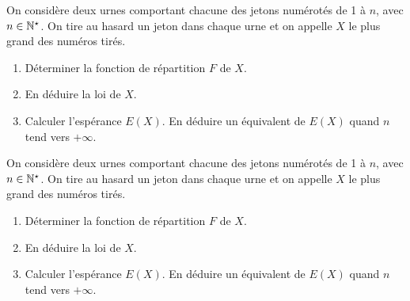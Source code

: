 \documentclass[a4paper, 11pt,reqno]{article}
\begin{document}
\begin{exercice}
	On consid\`ere deux urnes comportant chacune des jetons num\'erot\'es de 1 \`a $n$, avec $n\in\mathbb{N}^{\star}$. On tire au hasard un jeton dans chaque urne et on appelle $X$ le plus grand des num\'eros tir\'es.
	\begin{enumerate}
		\item D\'eterminer la fonction de r\'epartition $F$ de $X$.
		\item En d\'eduire la loi de $X$.
		\item Calculer l'esp\'erance $E(X)$. En d\'eduire un \'equivalent de $E(X)$ quand $n$ tend vers $+\infty$.
	\end{enumerate}
\end{exercice}
\begin{correction}
	On consid\`ere deux urnes comportant chacune des jetons num\'erot\'es de 1 \`a $n$, avec $n\in\mathbb{N}^{\star}$. On tire au hasard un jeton dans chaque urne et on appelle $X$ le plus grand des num\'eros tir\'es.
	\begin{enumerate}
		\item D\'eterminer la fonction de r\'epartition $F$ de $X$.
		\item En d\'eduire la loi de $X$.
		\item Calculer l'esp\'erance $E(X)$. En d\'eduire un \'equivalent de $E(X)$ quand $n$ tend vers $+\infty$.
	\end{enumerate}
\end{correction}

\end{document}
